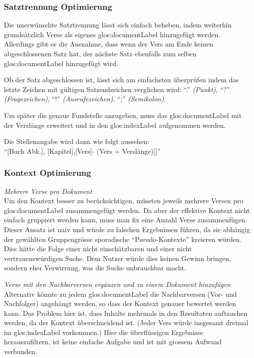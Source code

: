 \subsubsection{Satztrennung Optimierung}
Die unerwünschte Satztrennung lässt sich einfach beheben, indem weiterhin grundsätzlich Verse als eigenes \gls{glos:documentLabel} hinzugefügt werden.
Allerdings gibt es die Ausnahme, dass wenn der Vers am Ende keinen abgeschlossenen Satz hat, der nächste Satz ebenfalls zum selben \gls{glos:documentLabel} hinzugefügt wird.

Ob der Satz abgeschlossen ist, lässt sich am einfachsten überprüfen indem das letzte Zeichen mit gültigen Satzendzeichen verglichen wird:
"`."' \textit{(Punkt)},
"`?"' \textit{(Fragezeichen)},
"`!"' \textit{(Ausrufezeichen)},
"`;"' \textit{(Semikolon)}.

Um später die genaue Fundstelle anzugeben, muss das \gls{glos:documentLabel} mit der Verslänge erweitert und in den \gls{glos:indexLabel} aufgenommen werden.

Die Stellenangabe wird dann wie folgt aussehen:\\
"`[Buch Abk.], [Kapitel],[Vers[- (Vers + Verslänge)]]"'

\subsubsection{Kontext Optimierung}
\label{sec:contextOptimaze}
\textit{Mehrere Verse pro Dokument}
\vspace{0.5em}\\
Um den Kontext besser zu berücksichtigen, müssten jeweils mehrere Versen pro \gls{glos:documentLabel} zusammengefügt werden.
Da aber der effektive Kontext nicht einfach gruppiert werden kann, muss man fix eine Anzahl Verse zusammenfügen.
Dieser Ansatz ist naiv und würde zu falschen Ergebnissen führen, da sie abhängig der gewählten Gruppengrösse sporadische "`Pseudo-Kontexte"' kreieren würden.
Dies hätte die Folge einer nicht einschätzbaren und einer nicht vertrauenswürdigen Suche.
Dem Nutzer würde dies keinen Gewinn bringen, sondern eher Verwirrung, was die Suche unbrauchbar macht.

\vspace{0.5em}
\textit{Verse mit den Nachbarversen ergänzen und zu einem Dokument hinzufügen}
\vspace{0.5em}\\
Alternativ könnte zu jedem \gls{glos:documentLabel} die Nachbarversen (Vor- und Nachfolger) angehängt werden, so dass der Kontext genauer bewertet werden kann.
Das Problem hier ist, dass Inhalte mehrmals in den Resultaten auftauchen werden, da der Kontext überschneidend ist. (Jeder Vers würde insgesamt dreimal im \gls{glos:indexLabel} vorkommen.)
Hier die überflüssigen Ergebnisse herauszufiltern, ist keine einfache Aufgabe und ist mit grossem Aufwand verbunden.

